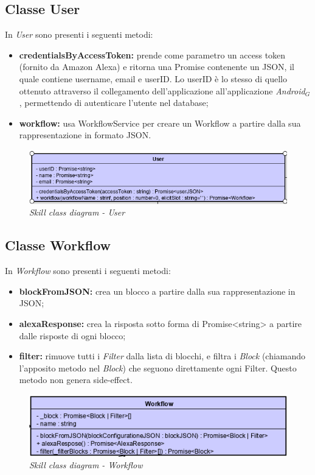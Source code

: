 \subsection{Classe User}
In \textit{User} sono presenti i seguenti metodi:
\begin{itemize}
    \item \textbf{credentialsByAccessToken:} prende come parametro un access token (fornito da Amazon Alexa) e ritorna una Promise contenente un JSON, il quale contiene username, email e userID. Lo userID è lo stesso di quello ottenuto attraverso il collegamento dell'applicazione all'applicazione \textit{Android$_{G}$}, permettendo di autenticare l'utente nel database;
    \item \textbf{workflow:} usa WorkflowService per creare un Workflow a partire dalla sua rappresentazione in formato JSON.
\end{itemize}
\begin{figure} [H]
    \centering
	\includegraphics[scale=0.8]{./images/user.PNG}
	\caption{\textit{Skill class diagram - User}}\label{classlambda}
\end{figure}
\subsection{Classe Workflow}
In \textit{Workflow} sono presenti i seguenti metodi:
\begin{itemize}
    \item \textbf{blockFromJSON:} crea un blocco a partire dalla sua rappresentazione in JSON;
    \item \textbf{alexaResponse:} crea la risposta sotto forma di Promise<string> a partire dalle risposte di ogni blocco;
    \item \textbf{filter:} rimuove tutti i \textit{Filter} dalla lista di blocchi, e filtra i \textit{Block} (chiamando l'apposito metodo nel \textit{Block}) che seguono direttamente ogni Filter. Questo metodo non genera side-effect.
\end{itemize}
\begin{figure} [H]
    \centering
	\includegraphics[scale=0.8]{./images/workflow.PNG}
	\caption{\textit{Skill class diagram - Workflow}}\label{classlambda}
\end{figure}
